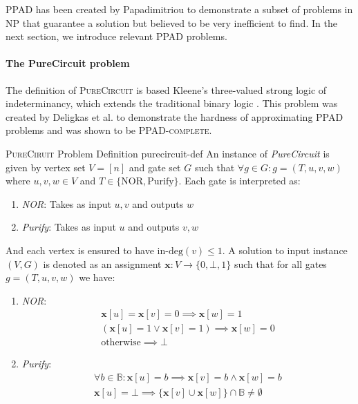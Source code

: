 \textsc{PPAD} has been created by Papadimitriou \cite{papadimitriou_ComplexityParityArgument_1994}
to demonstrate a subset of problems in \textsc{NP} that guarantee
a solution but believed to be very inefficient to find.
In the next section,
we introduce relevant \textsc{PPAD} problems.

\paragraph{The PureCircuit problem}
\label{par:pure-circ-def}

The definition of \textsc{PureCircuit} is based Kleene's three-valued strong logic of indeterminancy,
which extends the traditional binary logic \cite{kleene_IntroductionMetamathematics_2009}.
This problem was created by Deligkas et al. \cite{deligkas_PureCircuitTightInapproximability_2024}
to demonstrate the hardness of approximating \textsc{PPAD} problems and was shown to be \textsc{PPAD-complete}.


\begin{definitionbox}{\textsc{PureCiruit} Problem Definition \cite{deligkas_PureCircuitTightInapproximability_2024}}{purecircuit-def}
An instance of \textit{PureCircuit} is given by vertex set $V= [n]$ and gate set $G$ such that
$\forall g \in G: g=(T,u,v,w)$ where $u,v,w \in V$ and $T \in \{\text{NOR}, \text{Purify}\}$.
Each gate is interpreted as:
\begin{enumerate}
    \item \textit{NOR}: Takes as input $u,v$ and outputs $w$
    \item \textit{Purify}: Takes as input $u$ and outputs $v,w$
\end{enumerate}
And each vertex is ensured to have $\text{in-deg}(v) \leq 1$.
A solution to input instance $(V,G)$ is denoted as an assignment $\mathbf{x} : V \to \{0, \bot, 1\}$
such that for all gates $g = (T,u,v,w)$ we have:
\begin{enumerate}
    \item \textit{NOR}:
       \begin{gather*}
            \mathbf{x}[u] = \mathbf{x}[v] = 0 \implies \mathbf{x}[w] = 1\\
            (\mathbf{x}[u] =1 \vee \mathbf{x}[v] =1) \implies \mathbf{x}[w] = 0 \\
            \text{otherwise} \implies \bot
        \end{gather*}

    \item \textit{Purify}: 
       \begin{gather*}
           \forall b \in \mathbb{B}: \mathbf{x}[u] = b \implies \mathbf{x}[v] = b \wedge \mathbf{x}[w] =  b\\
           \mathbf{x}[u] = \bot \implies \{\mathbf{x}[v] \cup \mathbf{x}[w] \} \cap \mathbb{B}\neq \emptyset
        \end{gather*}
\end{enumerate}
\end{definitionbox}

